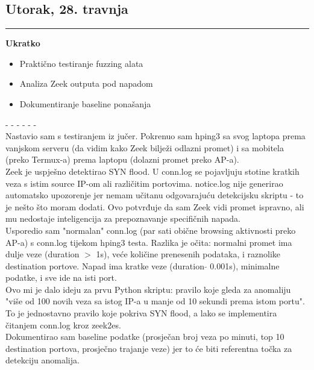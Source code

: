 \documentclass[12pt, a4paper]{article}
\newcommand{\dan}[1]{
    \subsection*{#1}
    \vspace{-0.5em} 
    \hrule \vspace{0.5em} 
}
\begin{document}
\dan{Utorak, 28. travnja}
\textbf{Ukratko}
\begin{itemize}
    \item Praktično testiranje fuzzing alata
    \item Analiza Zeek outputa pod napadom
    \item Dokumentiranje baseline ponašanja
\end{itemize}
- - - - - - \\
Nastavio sam s testiranjem iz jučer. Pokrenuo sam hping3 sa svog laptopa prema vanjskom serveru (da vidim kako Zeek bilježi odlazni promet) i sa mobitela (preko Termux-a) prema laptopu (dolazni promet preko AP-a).
\\
Zeek je uspješno detektirao SYN flood. U conn.log se pojavljuju stotine kratkih veza s istim source IP-om ali različitim portovima. notice.log nije generirao automatsko upozorenje jer nemam učitanu odgovarajuću detekcijsku skriptu - to je nešto što moram dodati. Ovo potvrđuje da sam Zeek vidi promet ispravno, ali mu nedostaje inteligencija za prepoznavanje specifičnih napada.
\\
Usporedio sam "normalan" conn.log (par sati obične browsing aktivnosti preko 
AP-a) s conn.log tijekom hping3 testa. Razlika je očita: normalni promet ima 
dulje veze (duration $>$ 1s), veće količine prenesenih podataka, i raznolike 
destination portove. Napad ima kratke veze (duration $\tilde{}$ 0.001s), minimalne podatke, i sve ide na isti port.
\\
Ovo mi je dalo ideju za prvu Python skriptu: pravilo koje gleda za anomaliju "više od 100 novih veza sa istog IP-a u manje od 10 sekundi prema istom portu". To je jednostavno pravilo koje pokriva SYN flood, a lako se implementira čitanjem conn.log kroz zeek2es.
\\
Dokumentirao sam baseline podatke (prosječan broj veza po minuti, top 10 destination portova, prosječno trajanje veze) jer to će biti referentna točka za detekciju anomalija.
\end{document}
